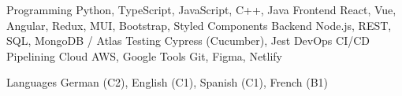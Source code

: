 

\begin{cvskills}

  \cvskill
    {Programming} %
    {Python, TypeScript, JavaScript, C++, Java} %
  \cvskill
    {Frontend} %
    {React, Vue, Angular, Redux, MUI, Bootstrap, Styled Components} %
  \cvskill
    {Backend} %
    {Node.js, REST, SQL, MongoDB / Atlas} %
  \cvskill
    {Testing} %
    {Cypress (Cucumber), Jest} %
  \cvskill
    {DevOps} %
    {CI/CD Pipelining} %
  \cvskill
    {Cloud} %
    {AWS, Google} %
  \cvskill
    {Tools} %
    {Git, Figma, Netlify} %

  \cvskill
    {Languages} %
    {German (C2), English (C1), Spanish (C1), French (B1)} %

\end{cvskills}
